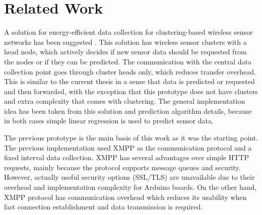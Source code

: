 

\chapter{Related Work} %

A solution for energy-efficient data collection for clustering-based wireless sensor networks has been suggested \cite{cluster_wsn_paper}. This solution has wireless sensor clusters with a head node, which actively decides if new sensor data should be requested from the nodes or if they can be predicted. The communication with the central data collection point goes through cluster heads only, which reduces transfer overhead. This is similar to the current thesis in a sense that data is predicted or requested and then forwarded, with the exception that this prototype does not have clusters and extra complexity that comes with clustering. 
The general implementation idea has been taken from this solution and prediction algorithm details, because in both cases simple linear regression is used to predict sensor data. 

The previous prototype \cite{prev_thesis} is the main basis of this work as it was the starting point. The previous implementation used XMPP as the communication protocol and a fixed interval data collection. XMPP has several advantages over simple HTTP requests, mainly because the protocol supports message queues and security. However, actually useful security options (SSL/TLS) are unavailable due to their overhead and implementation complexity for Arduino boards. On the other hand, XMPP protocol has communication overhead which reduces its usability when fast connection establishment and data transmission is required.










 






